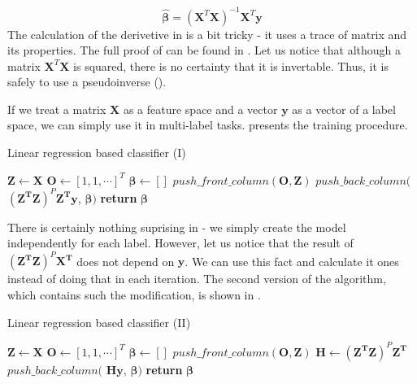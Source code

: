 \begin{equation}\label{eq:LR5}
    \boldsymbol{\hat{\beta}} = (\boldsymbol{X}^T\boldsymbol{X})^{-1}\boldsymbol{X}^T\boldsymbol{y}
\end{equation}
The calculation of the derivetive in  is a bit tricky - it uses a trace of matrix and its properties. The full proof of  can be found in . Let us notice that although a matrix $\boldsymbol{X}^T\boldsymbol{X}$ is squared, there is no certainty that it is invertable. Thus, it is safely to use a pseudoinverse (\cite{Trevor}).

If we treat a matrix $\boldsymbol{X}$ as a feature space and a vector $\boldsymbol{y}$ as a vector of a label space, we can simply use it in multi-label tasks.  presents the training procedure.

\begin{algorithm}
    \caption{Linear regression based classifier (I)}\label{alg:LR0}
    \begin{algorithmic}[1]
        \State $\boldsymbol{Z} \gets \boldsymbol{X}$ 
        \State $\boldsymbol{O} \gets [1, 1, \cdots]^T$ 
        \State $\boldsymbol{\beta} \gets []$
        \State $push\_front\_column(\boldsymbol{O}, \boldsymbol{Z})$
            \State $push\_back\_column($ $(\boldsymbol{Z^T}\boldsymbol{Z})^P\boldsymbol{Z^T}\boldsymbol{y}$, $\boldsymbol{\beta})$ 
        \EndFor
        \State \textbf{return} $\boldsymbol{\beta}$
    \EndFunction
    \end{algorithmic}
\end{algorithm}
There is certainly nothing suprising in  - we simply create the model independently for each label. However, let us notice that the result of $(\boldsymbol{Z^T}\boldsymbol{Z})^P\boldsymbol{X^T}$ does not depend on $\boldsymbol{y}$. We can use this fact and calculate it ones instead of doing that in each iteration. The second version of the algorithm, which contains such the modification, is shown in . 

\begin{algorithm}
    \caption{Linear regression based classifier (II)}\label{alg:LR1}
    \begin{algorithmic}[1]
        \State $\boldsymbol{Z} \gets \boldsymbol{X}$ 
        \State $\boldsymbol{O} \gets [1, 1, \cdots]^T$ 
        \State $\boldsymbol{\beta} \gets []$
        \State $push\_front\_column(\boldsymbol{O}, \boldsymbol{Z})$
        \State $\boldsymbol{H} \gets (\boldsymbol{Z^T}\boldsymbol{Z})^P\boldsymbol{Z^T}$
            \State $push\_back\_column($ $\boldsymbol{H}\boldsymbol{y}$, $\boldsymbol{\beta})$ 
        \EndFor
        \State \textbf{return} $\boldsymbol{\beta}$
    \EndFunction
    \end{algorithmic}
\end{algorithm}


